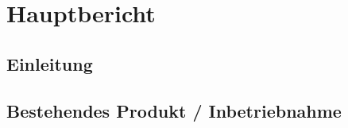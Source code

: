 \documentclass[12pt, a4paper]{report}
\begin{document}
	
	
		
	
	\tableofcontents
	\newpage
	
	
	
	\part{Hauptbericht}
	
	\chapter{Einleitung}
	
	
	
	
	
	
	\chapter{Bestehendes Produkt / Inbetriebnahme}
	
	
\end{document}

